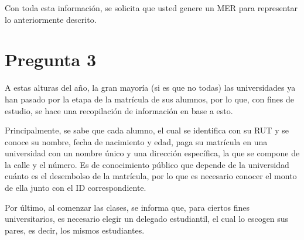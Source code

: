 \documentclass[letterpaper]{article}
\begin{document}
Con toda esta información, se solicita que usted genere un MER para representar lo anteriormente descrito.

\section{Pregunta 3}

A estas alturas del año, la gran mayoría (si es que no todas) las universidades ya han pasado por la etapa de la matrícula de sus alumnos, por lo que, con fines de estudio, se hace una recopilación de información en base a esto.

Principalmente, se sabe que cada alumno, el cual se identifica con su RUT y se conoce su nombre, fecha de nacimiento y edad, paga su matrícula en una universidad con un nombre único y una dirección específica, la que se compone de la calle y el número. Es de conocimiento público que depende de la universidad cuánto es el desembolso de la matrícula, por lo que es necesario conocer el monto de ella junto con el ID correspondiente.

Por último, al comenzar las clases, se informa que, para ciertos fines universitarios, es necesario elegir un delegado estudiantil, el cual lo escogen sus pares, es decir, los mismos estudiantes.
\end{document}
